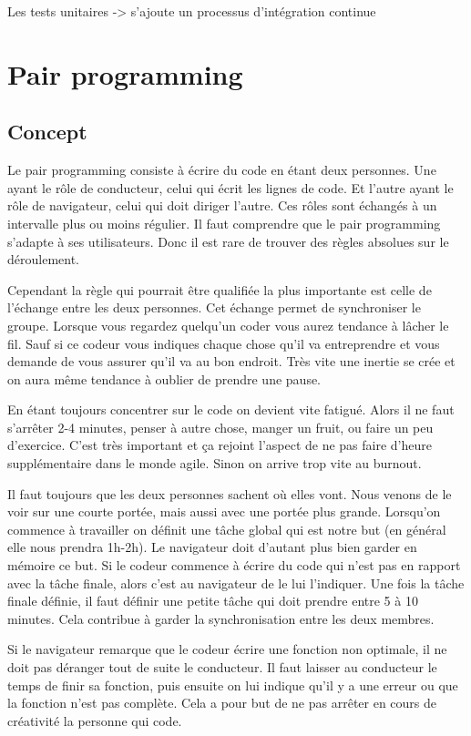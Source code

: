 \documentclass[journal, a4paper]{IEEEtran}
\begin{document}
Les tests unitaires -> s'ajoute un processus d'intégration continue



\section{Pair programming}
\subsection{Concept}
Le pair programming consiste à écrire du code en étant deux personnes. Une ayant le rôle de
conducteur, celui qui écrit les lignes de code. Et l’autre ayant le rôle de navigateur, celui qui doit
diriger l’autre. Ces rôles sont échangés à un intervalle plus ou moins régulier. Il faut comprendre que
le pair programming s’adapte à ses utilisateurs. Donc il est rare de trouver des règles absolues sur le
déroulement.

Cependant la règle qui pourrait être qualifiée la plus importante est celle de l’échange entre les deux
personnes. Cet échange permet de synchroniser le groupe. Lorsque vous regardez quelqu’un coder
vous aurez tendance à lâcher le fil. Sauf si ce codeur vous indiques chaque chose qu’il va
entreprendre et vous demande de vous assurer qu’il va au bon endroit. Très vite une inertie se crée
et on aura même tendance à oublier de prendre une pause.

En étant toujours concentrer sur le code on devient vite fatigué. Alors il ne faut s’arrêter 2-4 minutes,
penser à autre chose, manger un fruit, ou faire un peu d’exercice. C’est très important et ça rejoint
l’aspect de ne pas faire d’heure supplémentaire dans le monde agile. Sinon on arrive trop vite au
burnout.

Il faut toujours que les deux personnes sachent où elles vont. Nous venons de le voir sur une courte
portée, mais aussi avec une portée plus grande. Lorsqu’on commence à travailler on définit une
tâche global qui est notre but (en général elle nous prendra 1h-2h). Le navigateur doit d’autant plus
bien garder en mémoire ce but. Si le codeur commence à écrire du code qui n’est pas en rapport
avec la tâche finale, alors c’est au navigateur de le lui l’indiquer. Une fois la tâche finale définie, il faut
définir une petite tâche qui doit prendre entre 5 à 10 minutes. Cela contribue à garder la
synchronisation entre les deux membres.

Si le navigateur remarque que le codeur écrire une fonction non optimale, il ne doit pas déranger
tout de suite le conducteur. Il faut laisser au conducteur le temps de finir sa fonction, puis ensuite on
lui indique qu’il y a une erreur ou que la fonction n’est pas complète. Cela a pour but de ne pas
arrêter en cours de créativité la personne qui code.
\end{document}
